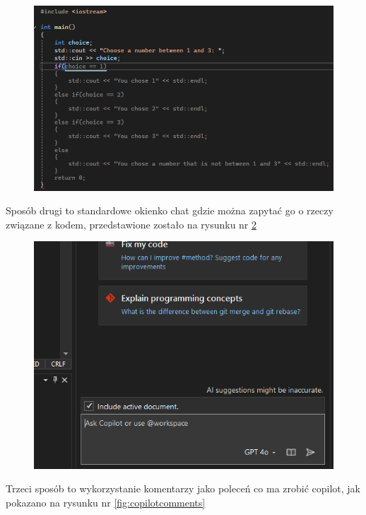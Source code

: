 \begin{figure}[H]
	\centering
	\includegraphics[width=1\linewidth]{images/CopilotSuggestion}
	\caption{}
	\label{fig:copilotsuggestion}
\end{figure}

Sposób drugi to standardowe okienko chat gdzie można zapytać go o rzeczy związane z kodem, przedstawione zostało na rysunku nr \ref{fig:copilotchat}

\begin{figure}[H]
	\centering
	\includegraphics[width=1\linewidth]{images/CopilotChat}
	\caption{}
	\label{fig:copilotchat}
\end{figure}

Trzeci sposób to wykorzystanie komentarzy jako poleceń co ma zrobić copilot, jak pokazano na rysunku nr \ref{fig:copilotcomments}

